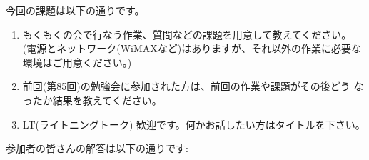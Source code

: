 \documentclass[mingoth,a4paper]{jsarticle}
\begin{document}

今回の課題は以下の通りです。
\begin{screen}
  \begin{enumerate}

  \item %
    もくもくの会で行なう作業、質問などの課題を用意して教えてください。
    (電源とネットワーク(WiMAXなど)はありますが、それ以外の作業に必要な
    環境はご用意ください。)

  \item %
    前回(第85回)の勉強会に参加された方は、前回の作業や課題がその後どう
    なったか結果を教えてください。

  \item %
    LT(ライトニングトーク) 歓迎です。何かお話したい方はタイトルを下さい。

  \end{enumerate}
\end{screen}

参加者の皆さんの解答は以下の通りです:
\end{document}
